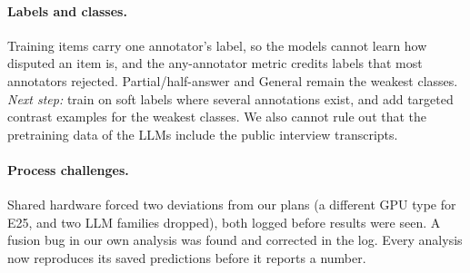 \paragraph{Labels and classes.}
Training items carry one annotator's label, so the models cannot learn how disputed an item is, and the any-annotator metric credits labels that most annotators rejected.
Partial/half-answer and General remain the weakest classes.
\emph{Next step:} train on soft labels where several annotations exist, and add targeted contrast examples for the weakest classes.
We also cannot rule out that the pretraining data of the LLMs include the public interview transcripts.

\paragraph{Process challenges.}
Shared hardware forced two deviations from our plans (a different GPU type for E25, and two LLM families dropped), both logged before results were seen.
A fusion bug in our own analysis was found and corrected in the log. Every analysis now reproduces its saved predictions before it reports a number.
